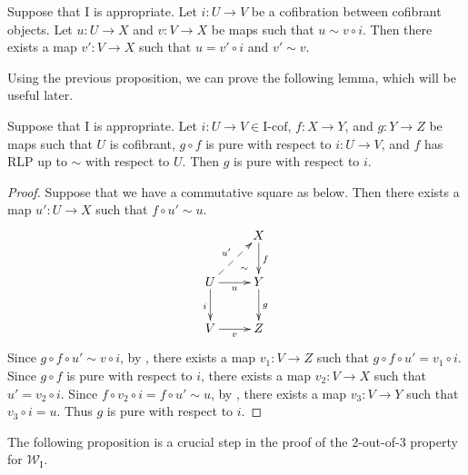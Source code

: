 \documentclass{amsart}
\theoremstyle{definition}
\newcommand{\we}{\mathcal{W}}
\newcommand{\I}{\mathrm{I}}
\newcommand{\class}[2]{#1\text{-}\mathrm{#2}}
\newcommand{\Icof}[1][\I]{\class{#1}{cof}}
\begin{document}
\begin{cor}
Suppose that $\I$ is appropriate.
Let $i : U \to V$ be a cofibration between cofibrant objects.
Let $u : U \to X$ and $v : V \to X$ be maps such that $u \sim v \circ i$.
Then there exists a map $v' : V \to X$ such that $u = v' \circ i$ and $v' \sim v$.
\end{cor}

Using the previous proposition, we can prove the following lemma, which will be useful later.

\begin{lem}
Suppose that $\I$ is appropriate.
Let $i : U \to V \in \Icof$, $f : X \to Y$, and $g : Y \to Z$ be maps such that $U$ is cofibrant, $g \circ f$
is pure with respect to $i : U \to V$, and $f$ has RLP up to $\sim$ with respect to $U$.
Then $g$ is pure with respect to $i$.
\end{lem}
\begin{proof}
Suppose that we have a commutative square as below.
Then there exists a map $u' : U \to X$ such that $f \circ u' \sim u$.
\[ \xymatrix{   \ar@{}[dr]|(.7){\sim}                & X \ar[d]^f \\
              U \ar@{-->}[ur]^{u'} \ar[d]_i \ar[r]_u & Y \ar[d]^g \\
              V \ar[r]_v                             & Z
            } \]
Since $g \circ f \circ u' \sim v \circ i$, by , there
exists a map $v_1 : V \to Z$ such that $g \circ f \circ u' = v_1 \circ i$.
Since $g \circ f$ is pure with respect to $i$, there exists a map $v_2 : V \to X$ such that $u' = v_2 \circ i$.
Since $f \circ v_2 \circ i = f \circ u' \sim u$, by ,
there exists a map $v_3 : V \to Y$ such that $v_3 \circ i = u$.
Thus $g$ is pure with respect to $i$.
\end{proof}

The following proposition is a crucial step in the proof of the 2-out-of-3 property for $\we_\I$.
\end{document}

